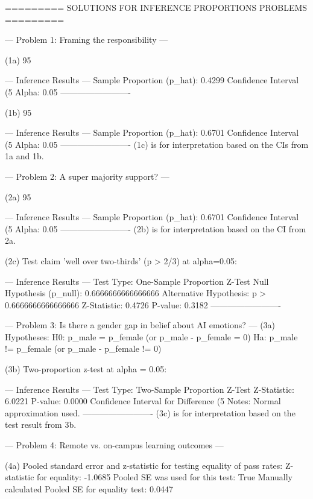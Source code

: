 ========= SOLUTIONS FOR INFERENCE PROPORTIONS PROBLEMS =========


--- Problem 1: Framing the responsibility ---

(1a) 95%

--- Inference Results ---
  Sample Proportion (p_hat): 0.4299
  Confidence Interval (5%
  Alpha: 0.05
-------------------------

(1b) 95%

--- Inference Results ---
  Sample Proportion (p_hat): 0.6701
  Confidence Interval (5%
  Alpha: 0.05
-------------------------
(1c) is for interpretation based on the CIs from 1a and 1b.


--- Problem 2: A super majority support? ---

(2a) 95%

--- Inference Results ---
  Sample Proportion (p_hat): 0.6701
  Confidence Interval (5%
  Alpha: 0.05
-------------------------
(2b) is for interpretation based on the CI from 2a.

(2c) Test claim 'well over two-thirds' (p > 2/3) at alpha=0.05:

--- Inference Results ---
  Test Type: One-Sample Proportion Z-Test
  Null Hypothesis (p_null): 0.6666666666666666
  Alternative Hypothesis: p > 0.6666666666666666
  Z-Statistic: 0.4726
  P-value: 0.3182
-------------------------


--- Problem 3: Is there a gender gap in belief about AI emotions? ---
(3a) Hypotheses: H0: p_male = p_female (or p_male - p_female = 0)
                 Ha: p_male != p_female (or p_male - p_female != 0)

(3b) Two-proportion z-test at alpha = 0.05:

--- Inference Results ---
  Test Type: Two-Sample Proportion Z-Test
  Z-Statistic: 6.0221
  P-value: 0.0000
  Confidence Interval for Difference (5%
  Notes: Normal approximation used.
-------------------------
(3c) is for interpretation based on the test result from 3b.


--- Problem 4: Remote vs. on-campus learning outcomes ---

(4a) Pooled standard error and z-statistic for testing equality of pass rates:
  Z-statistic for equality: -1.0685
  Pooled SE was used for this test: True
  Manually calculated Pooled SE for equality test: 0.0447

